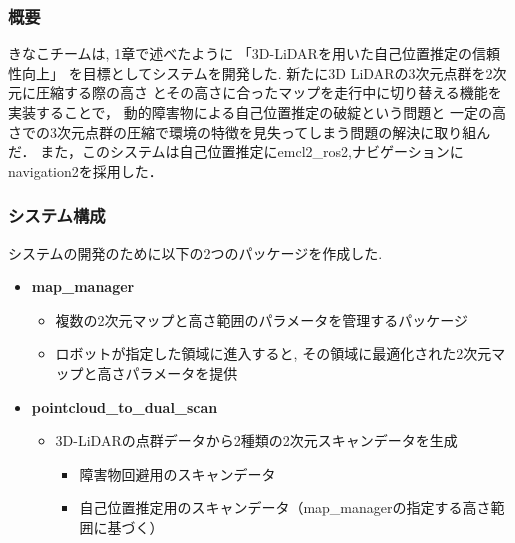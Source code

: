 \subsubsection{概要}
きなこチームは, 1章で述べたように
「3D-LiDARを用いた自己位置推定の信頼性向上」
を目標としてシステムを開発した.
新たに3D LiDARの3次元点群を2次元に圧縮する際の高さ
とその高さに合ったマップを走行中に切り替える機能を実装することで，
動的障害物による自己位置推定の破綻という問題と
一定の高さでの3次元点群の圧縮で環境の特徴を見失ってしまう問題の解決に取り組んだ．
また，このシステムは自己位置推定にemcl2\_ros2,ナビゲーションにnavigation2を採用した．



\subsubsection{システム構成}
システムの開発のために以下の2つのパッケージを作成した. 

\begin{itemize}
  \item \textbf{map\_manager}
    \begin{itemize}
      \item 複数の2次元マップと高さ範囲のパラメータを管理するパッケージ
      \item ロボットが指定した領域に進入すると, その領域に最適化された2次元マップと高さパラメータを提供
    \end{itemize}
  \item \textbf{pointcloud\_to\_dual\_scan}
    \begin{itemize}
      \item 3D-LiDARの点群データから2種類の2次元スキャンデータを生成
        \begin{itemize}
          \item 障害物回避用のスキャンデータ
          \item 自己位置推定用のスキャンデータ（map\_managerの指定する高さ範囲に基づく）
        \end{itemize}
    \end{itemize}
\end{itemize}

